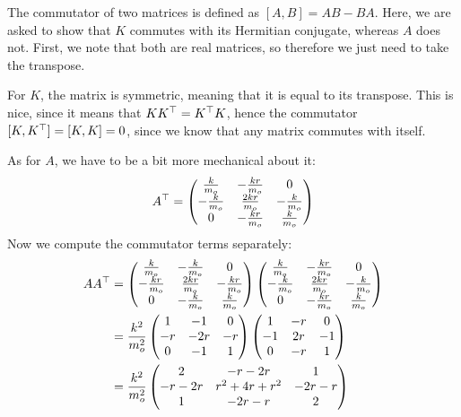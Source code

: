 \documentclass{article}
\begin{document}
\begin{solution}
	The commutator of two matrices is defined as $[A, B] = AB - BA$. Here, we are asked to show that $K$ commutes
	with its Hermitian conjugate, whereas $A$ does not. First, we note that both are real matrices, so 
	therefore we just need to take the transpose. 

	For $K$, the matrix is symmetric, meaning that it is equal to its transpose. This is nice, since it means 
	that $K K^\top = K^\top K$, hence the commutator $[K, K^\top] = [K, K] = 0$, since we know that any matrix 
	commutes with itself. 
	
	As for $A$, we have to be a bit more mechanical about it:
	\[
		A^\top = \begin{pmatrix} \frac{k}{m_o} & -\frac{kr}{m_o} & 0\\ -\frac{k}{m_o} & \frac{2kr}{m_o} & -\frac{k}{m_o}\\ 0 & -\frac{kr}{m_o} & \frac{k}{m_o } \end{pmatrix} 
	\] 
	Now we compute the commutator terms separately:
	\begin{align*}
		A A^\T &= \begin{pmatrix}  \frac{k}{m_o} & -\frac{k}{m_o} & 0\\ -\frac{kr}{m_o} & \frac{2kr}{m_o} & -\frac{kr}{m_o}\\ 0 & -\frac{k}{m_o} & \frac{k}{m_o} \end{pmatrix} 
		\begin{pmatrix}  \frac{k}{m_o} & -\frac{kr}{m_o} & 0\\ -\frac{k}{m_o} & \frac{2kr}{m_o} & -\frac{k}{m_o}\\ 0 & -\frac{kr}{m_o} & \frac{k}{m_o } \end{pmatrix} \\
&= \frac{k^2}{m_o^2}\begin{pmatrix} 1 & -1 & 0\\-r & -2r & -r\\0 & -1 & 1 \end{pmatrix} \begin{pmatrix} 1 & -r & 0\\ -1 & 2r & -1 \\ 0 & -r & 1 \end{pmatrix}  \\
&= \frac{k^2}{m_o^2}\begin{pmatrix} 2 & -r - 2r & 1 \\-r - 2r & r^2 + 4r + r^2 & -2r - r\\1 & -2r - r & 2  \end{pmatrix}  \\

\end{align*}
\end{solution}
\end{document}
